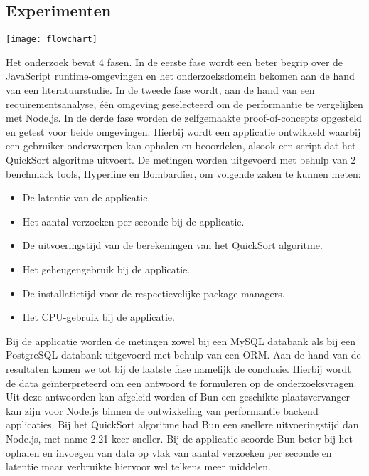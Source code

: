 \documentclass[a0,portrait]{hogent-poster}
\begin{document}
\begin{multicols}{2}
\section{Experimenten}
\begin{center}
  \captionsetup{type=figure}
  \texttt{[image: flowchart]}
\end{center}
Het onderzoek bevat 4 fasen. 
In de eerste fase wordt een beter begrip over de JavaScript runtime-omgevingen en het onderzoeksdomein bekomen aan de hand van een literatuurstudie.
In de tweede fase wordt, aan de hand van een requirementsanalyse, één omgeving geselecteerd om de performantie te vergelijken met Node.js.
In de derde fase worden de zelfgemaakte proof-of-concepts opgesteld en getest voor beide omgevingen. 
Hierbij wordt een applicatie ontwikkeld waarbij een gebruiker onderwerpen kan ophalen en beoordelen, alsook een script dat het QuickSort algoritme uitvoert.
De metingen worden uitgevoerd met behulp van 2 benchmark tools, Hyperfine en Bombardier, om volgende zaken te kunnen meten:
\begin{itemize}
    \item De latentie van de applicatie.
    \item Het aantal verzoeken per seconde bij de applicatie.
    \item De uitvoeringstijd van de berekeningen van het QuickSort algoritme.
    \item Het geheugengebruik bij de applicatie.
    \item De installatietijd voor de respectievelijke package managers.
    \item Het CPU-gebruik bij de applicatie.
\end{itemize}
Bij de applicatie worden de metingen zowel bij een MySQL databank als bij een PostgreSQL databank uitgevoerd met behulp van een ORM.
Aan de hand van de resultaten komen we tot bij de laatste fase namelijk de conclusie. Hierbij wordt de data geïnterpreteerd om een antwoord te formuleren op de onderzoeksvragen.
Uit deze antwoorden kan afgeleid worden of Bun een geschikte plaatsvervanger kan zijn voor Node.js binnen de ontwikkeling van performantie backend applicaties.
Bij het QuickSort algoritme had Bun een snellere uitvoeringstijd dan Node.js, met name 2.21 keer sneller.
Bij de applicatie scoorde Bun beter bij het ophalen en invoegen van data op vlak van
aantal verzoeken per seconde en latentie maar verbruikte hiervoor wel telkens meer middelen.
\begin{center}

\end{center}
\end{multicols}
\end{document}
